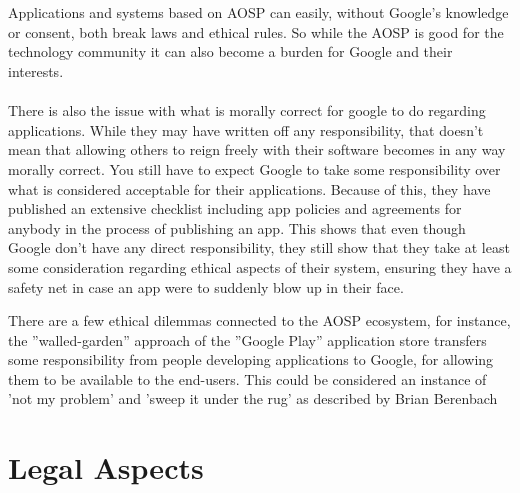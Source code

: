 \documentclass[conference]{IEEEtran}
\begin{document}
\\\\Applications and systems based on AOSP can easily, without Google's knowledge or consent, both break laws and ethical rules. So while the AOSP is good for the technology community it can also become a burden for Google and their interests.
\\\\There is also the issue with what is morally correct for google to do regarding applications. While they may have written off any responsibility, that doesn't mean that allowing others to reign freely with their software becomes in any way morally correct. You still have to expect Google to take some responsibility over what is considered acceptable for their applications. Because of this, they have published an extensive checklist including app policies and agreements for anybody in the process of publishing an app.\cite{app-publishing} This shows that even though Google don't have any direct responsibility, they still show that they take at least some consideration regarding ethical aspects of their system, ensuring they have a safety net in case an app were to suddenly blow up in their face. 

There are a few ethical dilemmas connected to the AOSP ecosystem, for instance, the ''walled-garden'' approach of the ''Google Play'' application store transfers some responsibility from people developing applications to Google, for allowing them to be available to the  end-users. This could be considered an instance of 'not my problem' and 'sweep it under the rug' as described by Brian Berenbach

\section{Legal Aspects}
\label{legal}
\end{document}
